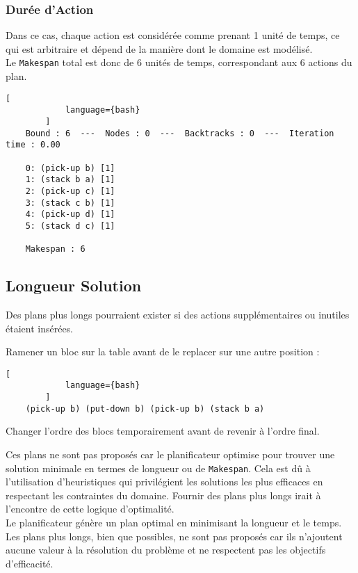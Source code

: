 \documentclass[../CSC_5RO16_TA_TP5.tex]{subfiles}
\begin{document}
\subsubsection{Durée d'Action}
\begin{resolution}
    Dans ce cas, chaque action est considérée comme prenant 1 unité de temps, ce qui est arbitraire et dépend de la manière dont le domaine est modélisé.\\

    Le \texttt{Makespan} total est donc de 6 unités de temps, correspondant aux 6 actions du plan.

    \begin{scriptsize}\mycode
        \begin{lstlisting}[
            language={bash}
        ]
    Bound : 6  ---  Nodes : 0  ---  Backtracks : 0  ---  Iteration time : 0.00
    
    0: (pick-up b) [1]
    1: (stack b a) [1]
    2: (pick-up c) [1]
    3: (stack c b) [1]
    4: (pick-up d) [1]
    5: (stack d c) [1]
    
    Makespan : 6
        \end{lstlisting}
    \end{scriptsize}
\end{resolution}

\subsection{Longueur Solution}
\begin{resolution}
    Des plans plus longs pourraient exister si des actions supplémentaires ou inutiles étaient insérées.
\end{resolution}
\begin{example}
    Ramener un bloc sur la table avant de le replacer sur une autre position :

    \begin{scriptsize}\mycode
        \begin{lstlisting}[
            language={bash}
        ]
    (pick-up b) (put-down b) (pick-up b) (stack b a)
        \end{lstlisting}
    \end{scriptsize}

    Changer l'ordre des blocs temporairement avant de revenir à l'ordre final.
\end{example}
\noindent Ces plans ne sont pas proposés car le planificateur optimise pour trouver une solution minimale en termes de longueur ou de \texttt{Makespan}. Cela est dû à l'utilisation d'heuristiques qui privilégient les solutions les plus efficaces en respectant les contraintes du domaine. Fournir des plans plus longs irait à l'encontre de cette logique d'optimalité.\\

\noindent Le planificateur génère un plan optimal en minimisant la longueur et le temps. Les plans plus longs, bien que possibles, ne sont pas proposés car ils n'ajoutent aucune valeur à la résolution du problème et ne respectent pas les objectifs d'efficacité.
\end{document}

